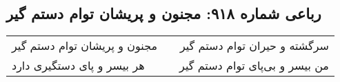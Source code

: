 \begin{center}
\section*{رباعی شماره ۹۱۸: مجنون و پریشان توام دستم گیر}
\label{sec:0918}
\begin{longtable}{l p{0.5cm} r}
مجنون و پریشان توام دستم گیر
&&
سرگشته و حیران توام دستم گیر
\\
هر بیسر و پای دستگیری دارد
&&
من بیسر و بی‌پای توام دستم گیر
\\
\end{longtable}
\end{center}
